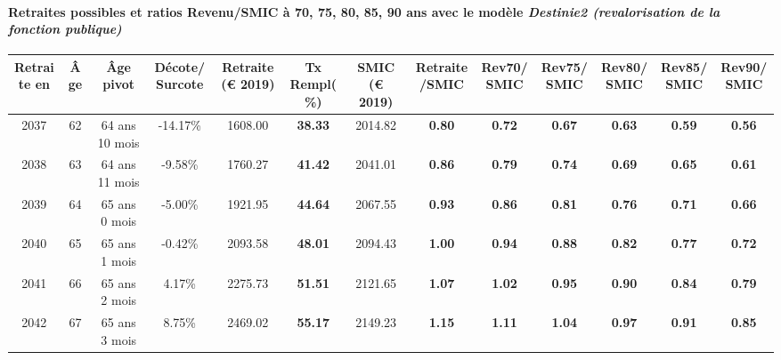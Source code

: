 \paragraph{Retraites possibles et ratios Revenu/SMIC à 70, 75, 80, 85, 90 ans avec le modèle \emph{Destinie2 (revalorisation de la fonction publique)}}  
 
{ \scriptsize \begin{center} 
\begin{tabular}[htb]{|c|c||c|c||c|c||c||c|c|c|c|c|c|} 
\hline 
 Retraite en &  Âge &  Âge pivot &  Décote/Surcote &  Retraite (\euro{} 2019) &  Tx Rempl(\%) &  SMIC (\euro{} 2019) &  Retraite/SMIC &  Rev70/SMIC &  Rev75/SMIC &  Rev80/SMIC &  Rev85/SMIC &  Rev90/SMIC \\ 
\hline \hline 
 2037 &  62 &  64 ans 10 mois &  -14.17\% &  1608.00 &  {\bf 38.33} &  2014.82 &  {\bf {\color{red} 0.80}} &  {\bf {\color{red} 0.72}} &  {\bf {\color{red} 0.67}} &  {\bf {\color{red} 0.63}} &  {\bf {\color{red} 0.59}} &  {\bf {\color{red} 0.56}} \\ 
\hline 
 2038 &  63 &  64 ans 11 mois &  -9.58\% &  1760.27 &  {\bf 41.42} &  2041.01 &  {\bf {\color{red} 0.86}} &  {\bf {\color{red} 0.79}} &  {\bf {\color{red} 0.74}} &  {\bf {\color{red} 0.69}} &  {\bf {\color{red} 0.65}} &  {\bf {\color{red} 0.61}} \\ 
\hline 
 2039 &  64 &  65 ans 0 mois &  -5.00\% &  1921.95 &  {\bf 44.64} &  2067.55 &  {\bf {\color{red} 0.93}} &  {\bf {\color{red} 0.86}} &  {\bf {\color{red} 0.81}} &  {\bf {\color{red} 0.76}} &  {\bf {\color{red} 0.71}} &  {\bf {\color{red} 0.66}} \\ 
\hline 
 2040 &  65 &  65 ans 1 mois &  -0.42\% &  2093.58 &  {\bf 48.01} &  2094.43 &  {\bf {\color{red} 1.00}} &  {\bf {\color{red} 0.94}} &  {\bf {\color{red} 0.88}} &  {\bf {\color{red} 0.82}} &  {\bf {\color{red} 0.77}} &  {\bf {\color{red} 0.72}} \\ 
\hline 
 2041 &  66 &  65 ans 2 mois &  4.17\% &  2275.73 &  {\bf 51.51} &  2121.65 &  {\bf 1.07} &  {\bf 1.02} &  {\bf {\color{red} 0.95}} &  {\bf {\color{red} 0.90}} &  {\bf {\color{red} 0.84}} &  {\bf {\color{red} 0.79}} \\ 
\hline 
 2042 &  67 &  65 ans 3 mois &  8.75\% &  2469.02 &  {\bf 55.17} &  2149.23 &  {\bf 1.15} &  {\bf 1.11} &  {\bf 1.04} &  {\bf {\color{red} 0.97}} &  {\bf {\color{red} 0.91}} &  {\bf {\color{red} 0.85}} \\ 
\hline 
\hline 
\end{tabular} 
\end{center} } 

